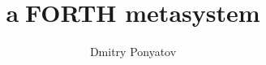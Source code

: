 
\title{{\textcircled{a}}\Huge FORTH metasystem}
\author{Dmitry Ponyatov\\}

\maketitle\clearpage
\secdown\secdown
\tableofcontents\clearpage

































